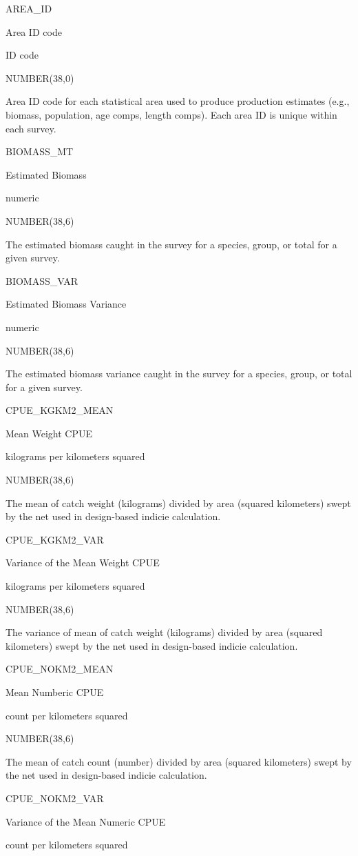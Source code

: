 \documentclass[
  letterpaper,
  oneside,
  open=any]{scrbook}
\begin{document}
AREA\_ID

Area ID code

ID code

NUMBER(38,0)

Area ID code for each statistical area used to produce production
estimates (e.g., biomass, population, age comps, length comps). Each
area ID is unique within each survey.

BIOMASS\_MT

Estimated Biomass

numeric

NUMBER(38,6)

The estimated biomass caught in the survey for a species, group, or
total for a given survey.

BIOMASS\_VAR

Estimated Biomass Variance

numeric

NUMBER(38,6)

The estimated biomass variance caught in the survey for a species,
group, or total for a given survey.

CPUE\_KGKM2\_MEAN

Mean Weight CPUE

kilograms per kilometers squared

NUMBER(38,6)

The mean of catch weight (kilograms) divided by area (squared
kilometers) swept by the net used in design-based indicie calculation.

CPUE\_KGKM2\_VAR

Variance of the Mean Weight CPUE

kilograms per kilometers squared

NUMBER(38,6)

The variance of mean of catch weight (kilograms) divided by area
(squared kilometers) swept by the net used in design-based indicie
calculation.

CPUE\_NOKM2\_MEAN

Mean Numberic CPUE

count per kilometers squared

NUMBER(38,6)

The mean of catch count (number) divided by area (squared kilometers)
swept by the net used in design-based indicie calculation.

CPUE\_NOKM2\_VAR

Variance of the Mean Numeric CPUE

count per kilometers squared
\end{document}
